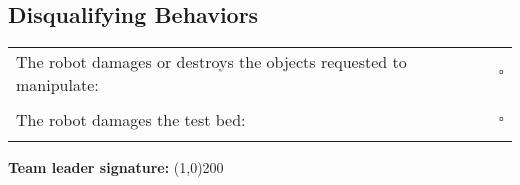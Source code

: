 \subsection*{Disqualifying Behaviors}
\begin{tabular}{ l c}
The robot damages or destroys the objects requested to manipulate: & $\square$ \\ \\
The robot damages the test bed: & $\square$ \\ \\
\end{tabular}

\vspace{1.5cm}
\begin{large}
\textbf{Team leader signature:}
\line(1,0){200}
\end{large}